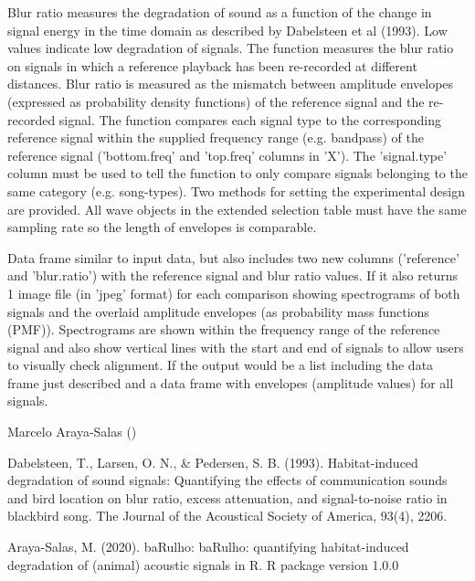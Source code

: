 \documentclass[letterpaper]{book}
\begin{document}
%
\begin{Details}\relax
Blur ratio measures the degradation of sound as a function of the change in signal energy in the time domain as described by Dabelsteen et al (1993). Low values indicate low degradation of signals. The function measures the blur ratio on signals in which a reference playback has been re-recorded at different distances. Blur ratio is measured as the mismatch between amplitude envelopes (expressed as probability density functions) of the reference signal and the re-recorded signal. The function compares each signal type to the corresponding reference signal within the supplied frequency range (e.g. bandpass) of the reference signal ('bottom.freq' and 'top.freq' columns in 'X'). The 'signal.type' column must be used to tell the function to only compare signals belonging to the same category (e.g. song-types). Two methods for setting the experimental design are provided. All wave objects in the extended selection table must have the same sampling rate so the length of envelopes is comparable.
\end{Details}
%
\begin{Value}
Data frame similar to input data, but also includes two new columns ('reference' and 'blur.ratio')
with the reference signal and blur ratio values. If  it also returns 1 image file (in 'jpeg' format) for each comparison showing spectrograms of both signals and the overlaid amplitude envelopes (as probability mass functions (PMF)). Spectrograms are shown within the frequency range of the reference signal and also show vertical lines with the start and end of signals to allow users to visually check alignment. If  the output would be a list including the data frame just described and a data frame with envelopes (amplitude values) for all signals.
\end{Value}
%
\begin{Author}\relax
Marcelo Araya-Salas ()
\end{Author}
%
\begin{References}\relax

Dabelsteen, T., Larsen, O. N., \& Pedersen, S. B. (1993). Habitat-induced degradation of sound signals: Quantifying the effects of communication sounds and bird location on blur ratio, excess attenuation, and signal-to-noise ratio in blackbird song. The Journal of the Acoustical Society of America, 93(4), 2206.

Araya-Salas, M. (2020). baRulho: baRulho: quantifying habitat-induced degradation of (animal) acoustic signals in R. R package version 1.0.0

\end{References}
\end{document}
